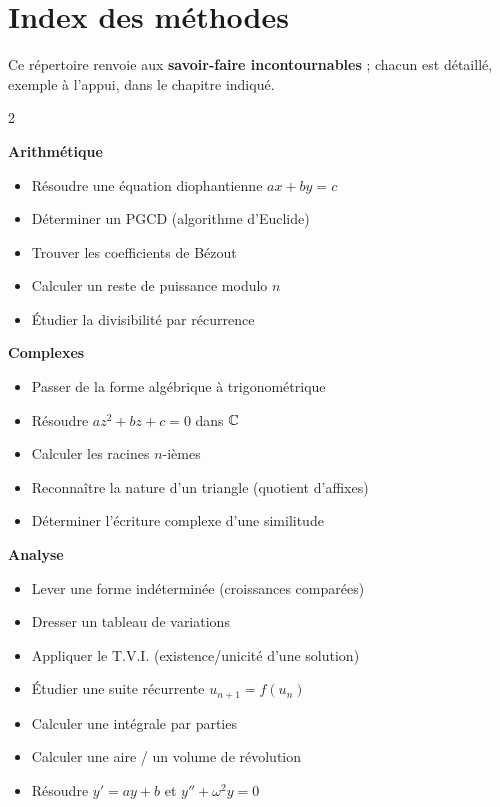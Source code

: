 \section{Index des méthodes}

Ce répertoire renvoie aux \textbf{savoir-faire incontournables} ; chacun est détaillé,
exemple à l'appui, dans le chapitre indiqué.

\begin{multicols}{2}\small\raggedright
\textbf{Arithmétique}
\begin{itemize}\setlength\itemsep{1pt}
\item Résoudre une équation diophantienne $ax+by=c$
\item Déterminer un PGCD (algorithme d'Euclide)
\item Trouver les coefficients de Bézout
\item Calculer un reste de puissance modulo $n$
\item Étudier la divisibilité par récurrence
\end{itemize}

\textbf{Complexes}
\begin{itemize}\setlength\itemsep{1pt}
\item Passer de la forme algébrique à trigonométrique
\item Résoudre $az^2+bz+c=0$ dans $\mathbb{C}$
\item Calculer les racines $n$-ièmes
\item Reconnaître la nature d'un triangle (quotient d'affixes)
\item Déterminer l'écriture complexe d'une similitude
\end{itemize}

\textbf{Analyse}
\begin{itemize}\setlength\itemsep{1pt}
\item Lever une forme indéterminée (croissances comparées)
\item Dresser un tableau de variations
\item Appliquer le T.V.I. (existence/unicité d'une solution)
\item Étudier une suite récurrente $u_{n+1}=f(u_n)$
\item Calculer une intégrale par parties
\item Calculer une aire / un volume de révolution
\item Résoudre $y'=ay+b$ et $y''+\omega^2y=0$
\end{itemize}


\end{multicols}
